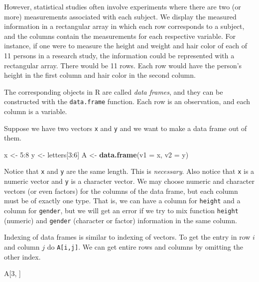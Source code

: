 \documentclass[]{book}
\newenvironment{Shaded}{\begin{snugshade}}{\end{snugshade}}
\newcommand{\KeywordTok}[1]{\textcolor[rgb]{0.13,0.29,0.53}{\textbf{{#1}}}}
\newcommand{\DataTypeTok}[1]{\textcolor[rgb]{0.13,0.29,0.53}{{#1}}}
\newcommand{\DecValTok}[1]{\textcolor[rgb]{0.00,0.00,0.81}{{#1}}}
\newcommand{\StringTok}[1]{\textcolor[rgb]{0.31,0.60,0.02}{{#1}}}
\newcommand{\NormalTok}[1]{{#1}}
\numberwithin{equation}{chapter}
\numberwithin{figure}{chapter}
\theoremstyle{plain}
\theoremstyle{definition}
\theoremstyle{remark}
\theoremstyle{definition}
\theoremstyle{definition}
\theoremstyle{remark}
\let\BeginKnitrBlock\begin \let\EndKnitrBlock\end
\begin{document}
However, statistical studies often involve experiments where there are
two (or more) measurements associated with each subject. We display the
measured information in a rectangular array in which each row
corresponds to a subject, and the columns contain the measurements for
each respective variable. For instance, if one were to measure the
height and weight and hair color of each of 11 persons in a research
study, the information could be represented with a rectangular array.
There would be 11 rows. Each row would have the person's height in the
first column and hair color in the second column.

The corresponding objects in R are called \emph{data frames}, and they
can be constructed with the \texttt{data.frame} function. Each row is an
observation, and each column is a variable.

\bigskip

\BeginKnitrBlock{example}
\protect\hypertarget{ex:unnamed-chunk-64}{}{\label{ex:unnamed-chunk-64}}Suppose
we have two vectors \texttt{x} and \texttt{y} and we want to make a data
frame out of them.
\EndKnitrBlock{example}

\begin{Shaded}
\begin{Highlighting}[]
\NormalTok{x <-}\StringTok{ }\DecValTok{5}\NormalTok{:}\DecValTok{8}
\NormalTok{y <-}\StringTok{ }\NormalTok{letters[}\DecValTok{3}\NormalTok{:}\DecValTok{6}\NormalTok{]}
\NormalTok{A <-}\StringTok{ }\KeywordTok{data.frame}\NormalTok{(}\DataTypeTok{v1 =} \NormalTok{x, }\DataTypeTok{v2 =} \NormalTok{y)}
\end{Highlighting}
\end{Shaded}

Notice that \texttt{x} and \texttt{y} are the same length. This is
\emph{necessary}. Also notice that \texttt{x} is a numeric vector and
\texttt{y} is a character vector. We may choose numeric and character
vectors (or even factors) for the columns of the data frame, but each
column must be of exactly one type. That is, we can have a column for
\texttt{height} and a column for \texttt{gender}, but we will get an
error if we try to mix function \texttt{height} (numeric) and
\texttt{gender} (character or factor) information in the same column.

Indexing of data frames is similar to indexing of vectors. To get the
entry in row \(i\) and column \(j\) do \texttt{A{[}i,j{]}}. We can get
entire rows and columns by omitting the other index.

\begin{Shaded}
\begin{Highlighting}[]
\NormalTok{A[}\DecValTok{3}\NormalTok{, ]}
\end{Highlighting}
\end{Shaded}
\end{document}
